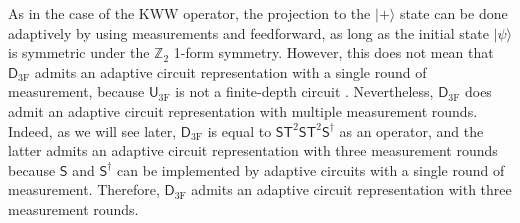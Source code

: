 \documentclass[aps,twocolumn,prx,floatfix,preprintnumbers, nofootinbib,10pt]{revtex4-2}
\numberwithin{equation}{section}
\theoremstyle{definition}
\theoremstyle{remark}
\theoremstyle{claim}
\def\ket#1{{|{#1}\rangle}}
\renewcommand{\sf}[1]{\mathsf{#1}}
\begin{document}
\vspace*{\baselineskip}
As in the case of the KWW operator, the projection to the $\ket{+}$ state can be done adaptively by using measurements and feedforward, as long as the initial state $\ket{\psi}$ is symmetric under the $\mathbb{Z}_2$ 1-form symmetry.
However, this does not mean that $\mathsf{D}_\text{3F}$ admits an adaptive circuit representation with a single round of measurement, because $\sf{U}_\text{3F}$ is not a finite-depth circuit \cite{HaahFidkowskiHastings2023, Shirley_2022}.
Nevertheless, $\mathsf{D}_\text{3F}$ does admit an adaptive circuit representation with multiple measurement rounds.
Indeed, as we will see later, $\mathsf{D}_\text{3F}$ is equal to $\mathsf{S}\mathsf{T}^2\mathsf{S}\mathsf{T}^2\mathsf{S}^{\dagger}$ as an operator, and the latter admits an adaptive circuit representation with three measurement rounds because $\mathsf{S}$ and $\mathsf{S}^{\dagger}$ can be implemented by adaptive circuits with a single round of measurement.
Therefore, $\mathsf{D}_\text{3F}$ admits an adaptive circuit representation with three measurement rounds.

\end{document}
